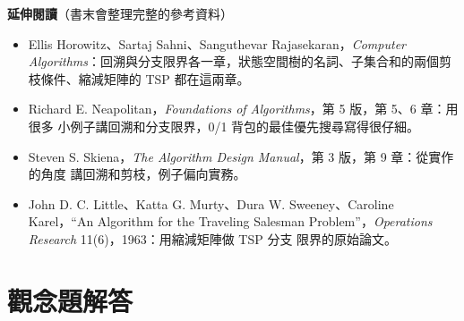 \textbf{延伸閱讀}（書末會整理完整的參考資料）

\begin{itemize}
\item Ellis Horowitz、Sartaj Sahni、Sanguthevar Rajasekaran，\textit{Computer
Algorithms}：回溯與分支限界各一章，狀態空間樹的名詞、子集合和的兩個剪枝條件、縮減矩陣的
TSP 都在這兩章。
\item Richard E. Neapolitan，\textit{Foundations of Algorithms}，第 5 版，第 5、6 章：用很多
小例子講回溯和分支限界，0/1 背包的最佳優先搜尋寫得很仔細。
\item Steven S. Skiena，\textit{The Algorithm Design Manual}，第 3 版，第 9 章：從實作的角度
講回溯和剪枝，例子偏向實務。
\item John D. C. Little、Katta G. Murty、Dura W. Sweeney、Caroline Karel，``An Algorithm for the
Traveling Salesman Problem''，\textit{Operations Research} 11(6)，1963：用縮減矩陣做 TSP 分支
限界的原始論文。
\end{itemize}

\section*{觀念題解答}

